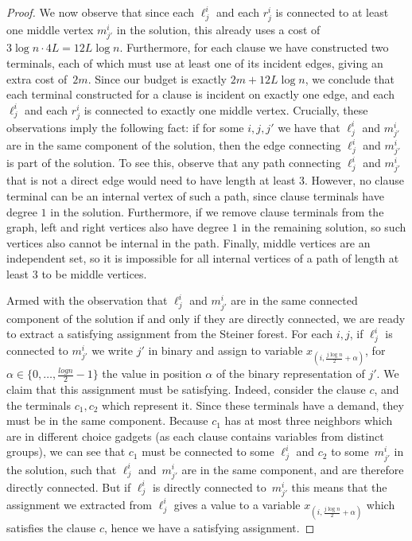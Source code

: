 \begin{proof}
We now observe that since each $\ell^i_j$ and each $r^i_j$ is connected to at
least one middle vertex $m^i_{j'}$ in the solution, this already uses a cost of
$3\log n\cdot 4L = 12 L\log n$. Furthermore, for each clause we have
constructed two terminals, each of which must use at least one of its incident
edges, giving an extra cost of~$2m$. Since our budget is exactly $2m+12L\log
n$, we conclude that each terminal constructed for a clause is incident on
exactly one edge, and each $\ell^i_j$ and each $r^i_j$ is connected to exactly
one middle vertex. Crucially, these observations imply the following fact: if
for some $i,j,j'$ we have that $\ell^i_j$ and $m^i_{j'}$ are in the same
component of the solution, then the edge connecting $\ell^i_j$ and $m^i_{j'}$
is part of the solution. To see this, observe that any path connecting
$\ell^i_j$ and $m^i_{j'}$ that is not a direct edge would need to have length at
least $3$. However, no clause terminal can be an internal vertex of such a
path, since clause terminals have degree $1$ in the solution. Furthermore, if
we remove clause terminals from the graph, left and right vertices also have
degree $1$ in the remaining solution, so such vertices also cannot be internal
in the path. Finally, middle vertices are an independent set, so it is
impossible for all internal vertices of a path of length at least $3$ to be
middle vertices.

Armed with the observation that $\ell^i_j$ and $m^i_{j'}$ are in the same
connected component of the solution if and only if they are directly connected,
we are ready to extract a satisfying assignment from the Steiner forest. For
each $i,j$, if $\ell^i_j$ is connected to $m^i_{j'}$ we write $j'$ in binary
and assign to variable $x_{(i,\frac{j\log n}{2}+\alpha)}$, for
$\alpha\in\{0,\ldots,\frac{log n}{2}-1\}$ the value in  position $\alpha$ of
the binary representation of $j'$. We claim that this assignment must be
satisfying. Indeed, consider the clause $c$, and the terminals $c_1,c_2$ which
represent it. Since these terminals have a demand, they must be in the same
component. Because $c_1$ has at most three neighbors which are in different
choice gadgets (as each clause contains variables from distinct groups), we can
see that $c_1$ must be connected to some $\ell^i_j$ and $c_2$ to some~$m^i_{j'}$
in the solution, such that $\ell^i_j$ and~$m^i_{j'}$ are in the same
component, and are therefore directly connected.  But if $\ell^i_j$ is directly
connected to~$m^i_{j'}$ this means that the assignment we extracted from
$\ell^i_j$ gives a value to a variable $x_{(i,\frac{j\log n}{2}+\alpha)}$ which
satisfies the clause $c$, hence we have a satisfying assignment.  \end{proof}


